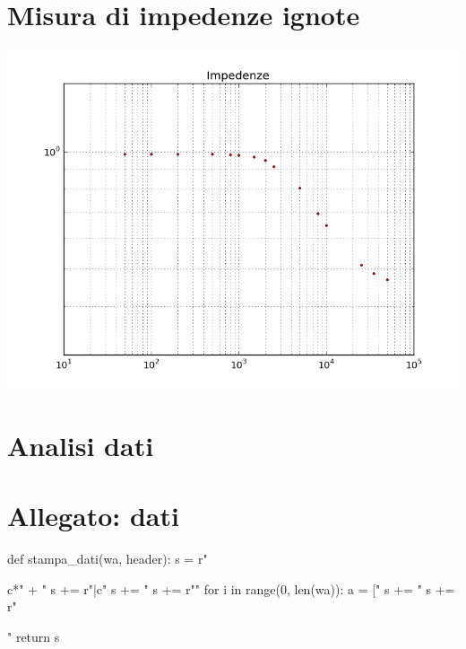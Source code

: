 \section{Misura di impedenze ignote}
\begin{center}
\includegraphics[scale=0.75]{grafici/C2-2.png} 
\end{center}

\section{Analisi dati}

\section{Allegato: dati}
\begin{sagesilent}
def stampa_dati(wa, header):
  s = r"\begin{tabular}{c*{" + "%
  s += r"}{|c}}"
  s += "%
  s += r"\midrule"
  for i in range(0, len(wa)):
    a = ["%
    s += "%
  s += r"\end{tabular}"
  return s
\end{sagesilent}

\begin{center}

\end{center}

